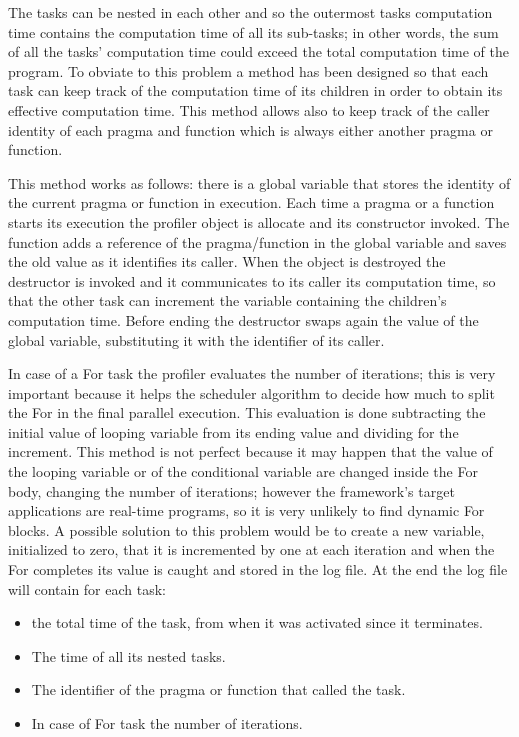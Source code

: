 \documentclass[a4paper,12pt,oneside]{book}
\begin{document}
The tasks can be nested in each other and so the outermost tasks computation time contains the computation time of all its sub-tasks; in other words, the sum of all the tasks’ computation time could exceed the total computation time of the program. To obviate to this problem a method has been designed so that each task can keep track of the computation time of its children in order to obtain its effective computation time. This method allows also to keep track of the caller identity of each pragma and function which is always either another pragma or function.

This method works as follows: there is a global variable that stores the identity of the current pragma or function in execution. Each time a pragma or a function starts its execution the profiler object is allocate and its constructor invoked. The function adds a reference of the pragma/function in the global variable and saves the old value as it identifies its caller. When the object is destroyed the destructor is invoked and it communicates to its caller its computation time, so that the other task can increment the variable containing the children's computation time. Before ending the destructor swaps again the value of the global variable, substituting it with the identifier of its caller. 

In case of a For task the profiler evaluates the number of iterations; this is very important because it helps the scheduler algorithm to decide how much to split the For in the final parallel execution. This evaluation is done subtracting the initial value of looping variable from its ending value and dividing for the increment. This method is not perfect because it may happen that the value of the looping variable or of the conditional variable are changed inside the For body, changing the number of iterations; however the framework’s target applications are real-time programs, so it is very unlikely to find dynamic For blocks. A possible solution to this problem would be to create a new variable, initialized to zero, that it is incremented by one at each iteration and when the For completes its value is caught and stored in the log file. At the end the log file will contain for each task:

\begin{itemize}
\item the total time of the task, from when it was activated since it terminates.
\item The time of all its nested tasks.
\item The identifier of the pragma or function that called the task.
\item In case of For task the number of iterations.
\end{itemize}
\end{document}
